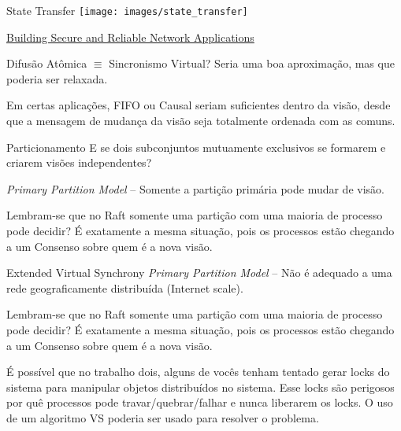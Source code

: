\begin{frame}{State Transfer}
\texttt{[image: images/state\_transfer]}


\href{http://www.gsd.inesc-id.pt/~ler/docencia/tfd0405/bib/BSRNA.pdf}{Building Secure and Reliable Network Applications}
\end{frame}


\begin{frame}{Difusão Atômica $\equiv$ Sincronismo Virtual?}
Seria uma boa aproximação, mas que poderia ser relaxada. 

Em certas aplicações, FIFO ou Causal seriam suficientes dentro da visão, desde que a mensagem de mudança da visão seja totalmente ordenada com as comuns.
\end{frame}


\begin{frame}{Particionamento}
E se dois subconjuntos mutuamente exclusivos se formarem e criarem visões independentes?

\pause \emph{Primary Partition Model} -- Somente a partição primária pode mudar de visão.

\pause Lembram-se que no Raft somente uma partição com uma maioria de processo pode decidir? É exatamente a mesma situação, pois os processos estão chegando a um Consenso sobre quem é a nova visão.
\end{frame}


\begin{frame}{Extended Virtual Synchrony}
\emph{Primary Partition Model} -- Não é adequado a uma rede geograficamente distribuída (Internet scale).

\pause Lembram-se que no Raft somente uma partição com uma maioria de processo pode decidir? É exatamente a mesma situação, pois os processos estão chegando a um Consenso sobre quem é a nova visão.
\end{frame}

É possível que no trabalho dois, alguns de vocês tenham tentado gerar locks do sistema para manipular objetos distribuídos no sistema. Esse locks são perigosos por quê processos pode travar/quebrar/falhar e nunca liberarem os locks. O uso de um algoritmo VS poderia ser usado para resolver o problema.\right 

